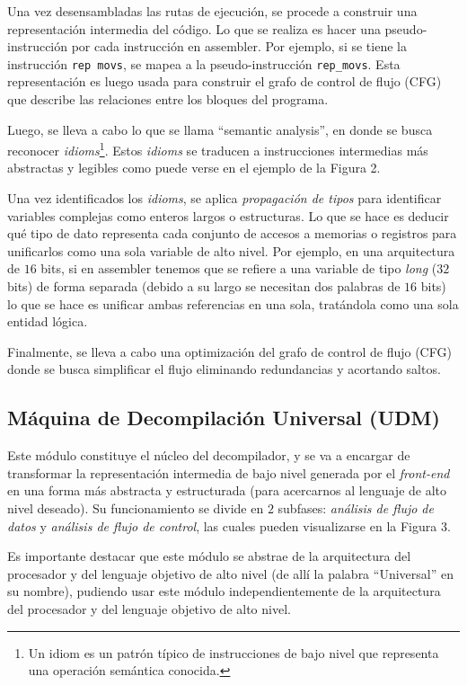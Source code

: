 \documentclass[runningheads]{llncs}
\begin{document}
Una vez desensambladas las rutas de ejecución, se procede a construir una representación intermedia
del código. Lo que se realiza es hacer una pseudo-instrucción por cada instrucción en assembler.
Por ejemplo, si se tiene la instrucción \verb|rep movs|, se mapea a la pseudo-instrucción
\verb|rep_movs|. Esta representación es luego usada para construir el grafo de control de flujo
(CFG) que describe las relaciones entre los bloques del programa.

Luego, se lleva a cabo lo que se llama “semantic analysis”, en donde se busca reconocer 
\textit{idioms}\footnote{Un idiom es un patrón típico de instrucciones de bajo nivel que representa una 
operación semántica conocida.}. Estos \textit{idioms} se traducen a instrucciones intermedias más 
abstractas y legibles como puede verse en el ejemplo de la Figura 2.

Una vez identificados los \textit{idioms}, se aplica \textit{propagación de tipos} para identificar 
variables complejas como enteros largos o estructuras. Lo que se hace es deducir qué tipo de dato 
representa cada conjunto de accesos a memorias o registros para unificarlos como una sola variable 
de alto nivel. Por ejemplo, en una arquitectura de $16$ bits, si en assembler tenemos que se refiere 
a una variable de tipo \textit{long} ($32$ bits) de forma separada (debido a su largo se necesitan dos 
palabras de $16$ bits) lo que se hace es unificar ambas referencias en una sola, tratándola como 
una sola entidad lógica.

Finalmente, se lleva a cabo una optimización del grafo de control de flujo (CFG) donde se busca 
simplificar el flujo eliminando redundancias y acortando saltos.

\subsection{Máquina de Decompilación Universal (UDM)}
Este módulo constituye el núcleo del decompilador, y se va a encargar de transformar la
representación intermedia de bajo nivel generada por el \textit{front-end} en una forma más abstracta
y estructurada (para acercarnos al lenguaje de alto nivel deseado). Su funcionamiento se divide en
$2$ subfases: \textit{análisis de flujo de datos} y \textit{análisis de flujo de control}, las cuales 
pueden visualizarse en la Figura 3.

Es importante destacar que este módulo se abstrae de la arquitectura del procesador y del lenguaje 
objetivo de alto nivel (de allí la palabra “Universal” en su nombre), pudiendo usar este módulo
independientemente de la arquitectura del procesador y del lenguaje objetivo de alto nivel.
\end{document}
